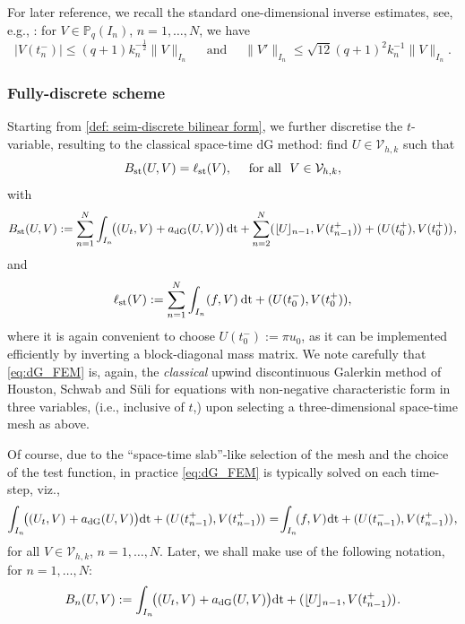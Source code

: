 \documentclass{amsart}
\newcommand{\norm}[2]{\|{#1}\|_{{#2}}}
\newcommand{\tjump}[1]{\lfloor\kern-0.4mm{#1}\kern-0.4mm\rfloor}
\newcommand{\inner}[3]{({#1},{#2})_{{#3}}}
\newcommand{\dt}{\,{\rm dt}}
\theoremstyle{definition}
\theoremstyle{remark}
\numberwithin{equation}{section}
\begin{document}
For later reference, we recall  {the standard} one-dimensional inverse estimates, see, e.g., \cite{schwab}: for $V\in \mathbb{P}_q(I_n)$, $n=1,\dots,N$, we have
\begin{equation}\label{time_trace_inv}
|V(t_{n}^-)| \leq (q+1)k_n^{-\frac{1}{2}}  \norm{V}{ I_n} \quad\text{ and }\quad \norm{V'}{I_n}\leq \sqrt{12}(q+1)^2k_n^{-1}  \|V\|_{ I_n}.
\end{equation}

\subsubsection{Fully-discrete scheme}
Starting from \eqref{def: seim-discrete bilinear form}, we further discretise the $t$-variable, resulting to the classical space-time dG method:  find $U \in  {\mathcal{V}}_{h,k}$ such that
\begin{equation}\label{eq:dG_FEM}
	B_{\rm st}(U,V)
	=
\ell_{\rm st}(V),\quad\text{ for all }\ V \in  {\mathcal{V}}_{h,k},
\end{equation}
 with
\begin{equation}\label{eq:space-time bilinear form}
  B_{\rm st}(U,V)
	:=
	\sum_{n=1}^N \int_{I_n}\!\! \big( \inner{U_t}{V}{} + a_{\rm dG}(U,V) \big) \dt + \sum_{n=2}^{N} \inner{\tjump{U}_{n-1}}{V( t_{n-1}^+)}{}
+	\inner{U(t_0^+)}{V(t_0^+)}{},
\end{equation}
and
\[
    \ell_{\rm st}(V)
    :=
    \sum_{n=1}^N \int_{I_n}
    \inner{f}{V}{}
    \dt
    +(U(t_0^-),V(t_0^+)),
    \]
where it is again convenient to choose $U(t_0^-) := \pi u_0$,  {as it can be implemented efficiently by inverting a block-diagonal mass matrix.} We note carefully that \eqref{eq:dG_FEM} is, again, the \emph{classical} upwind discontinuous Galerkin method of Houston, Schwab and S\"uli \cite{hss} for equations with non-negative characteristic form in three variables, (i.e., inclusive of $t$,) upon selecting a three-dimensional space-time mesh as above.

Of course, due to the ``space-time slab''-like selection of the mesh  {and the choice of the test function}, in practice \eqref{eq:dG_FEM} is typically solved on each time-step, viz.,
\[
        \int_{I_n}\! \! \big( \inner{U_t}{V}{} + a_{\rm dG}(U,V) \big)\! \dt +\inner{U(t_{n-1}^+)}{V( t_{n-1}^+)}{}
        =\! \int_{I_n}\! \inner{f}{V}{} \! \dt+\inner{U(t_{n-1}^-)}{V( t_{n-1}^+)}{},
\]
for all $V\in  {\mathcal{V}}_{h,k}$, $n=1,\dots, N$. Later, we shall make use of the following notation, for $n=1,\dots,N$:
\begin{equation}\label{B_n}
 B_n(U,V):= \int_{I_n}\! \! \big( \inner{U_t}{V}{} + a_{\rm dG}(U,V) \big)\! \dt +\inner{\tjump{U}_{n-1}}{V( t_{n-1}^+)}{}.
\end{equation}
\end{document}
